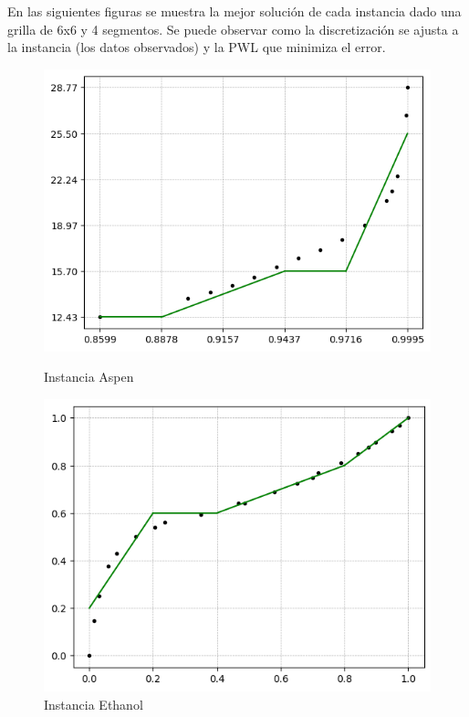 \documentclass{article}
\begin{document}
        En las siguientes figuras se muestra la mejor solución de cada instancia dado una grilla de 6x6 y 4 segmentos. Se puede observar como la discretización se ajusta a la instancia (los datos observados) y la PWL que minimiza el error.

    \begin{figure}[h!]
          \centering
          \begin{minipage}{.3\textwidth}
            \centering
            \includegraphics[width=.8\linewidth]{graficos/aspen_6x6_4.png}
            \caption{Instancia Aspen}
          \end{minipage}%
          \begin{minipage}{.3\textwidth}
            \centering
            \includegraphics[width=.8\linewidth]{graficos/ethanol_6x6_4.png}
            \caption{Instancia Ethanol}
          \end{minipage}%
          \begin{minipage}{.3\textwidth}
            \centering

\end{minipage}
\end{figure}
\end{document}
